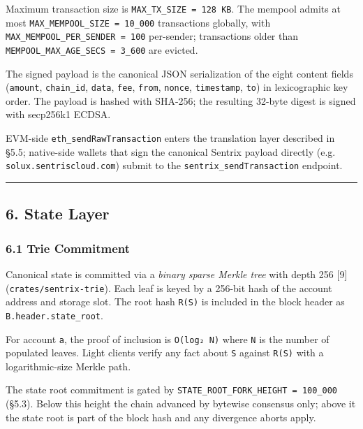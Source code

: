 \documentclass[11pt,a4paper]{article}
\begin{document}
Maximum transaction size is \texttt{MAX\_TX\_SIZE\ =\ 128\ KB}. The
mempool admits at most \texttt{MAX\_MEMPOOL\_SIZE\ =\ 10\_000}
transactions globally, with \texttt{MAX\_MEMPOOL\_PER\_SENDER\ =\ 100}
per-sender; transactions older than
\texttt{MEMPOOL\_MAX\_AGE\_SECS\ =\ 3\_600} are evicted.

The signed payload is the canonical JSON serialization of the eight
content fields (\texttt{amount}, \texttt{chain\_id}, \texttt{data},
\texttt{fee}, \texttt{from}, \texttt{nonce}, \texttt{timestamp},
\texttt{to}) in lexicographic key order. The payload is hashed with
SHA-256; the resulting 32-byte digest is signed with secp256k1 ECDSA.

EVM-side \texttt{eth\_sendRawTransaction} enters the translation layer
described in §5.5; native-side wallets that sign the canonical Sentrix
payload directly (e.g. \texttt{solux.sentriscloud.com}) submit to the
\texttt{sentrix\_sendTransaction} endpoint.

\begin{center}\rule{0.5\linewidth}{0.5pt}\end{center}

\hypertarget{6-state-layer}{%
\subsection{6. State Layer}\label{6-state-layer}}

\hypertarget{61-trie-commitment}{%
\subsubsection{6.1 Trie Commitment}\label{61-trie-commitment}}

Canonical state is committed via a \emph{binary sparse Merkle tree} with
depth 256 {[}9{]} (\texttt{crates/sentrix-trie}). Each leaf is keyed by
a 256-bit hash of the account address and storage slot. The root hash
\texttt{R(S)} is included in the block header as
\texttt{B.header.state\_root}.

For account \texttt{a}, the proof of inclusion is \texttt{O(log₂\ N)}
where \texttt{N} is the number of populated leaves. Light clients verify
any fact about \texttt{S} against \texttt{R(S)} with a logarithmic-size
Merkle path.

The state root commitment is gated by
\texttt{STATE\_ROOT\_FORK\_HEIGHT\ =\ 100\_000} (§5.3). Below this
height the chain advanced by bytewise consensus only; above it the state
root is part of the block hash and any divergence aborts apply.
\end{document}
